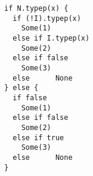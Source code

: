 \begin{lstlisting}[style=reclojureScala]
if N.typep(x) {
  if (!I).typep(x)
    Some(1)
  else if I.typep(x)
    Some(2)
  else if false
    Some(3)
  else      None
} else {
  if false
    Some(1)
  else if false
    Some(2)
  else if true
    Some(3)
  else      None
}
\end{lstlisting}
